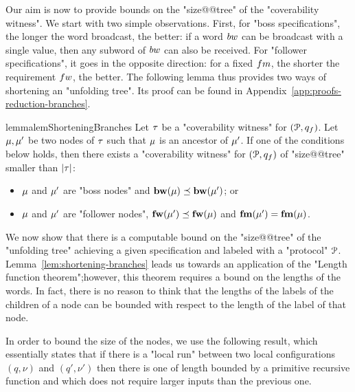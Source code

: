 Our aim is now to provide bounds on the "size@@tree" of the "coverability witness". We start with two simple observations. First, for "boss specifications", the longer the word broadcast, the better: if a word $\bossspec$ can be broadcast with a single value, then any subword of $\bossspec$ can also be received. 
For "follower specifications", it goes in the opposite direction: for a fixed $\followmessagespec$, the shorter the requirement $\followwordspec$, the better. The following lemma thus provides two ways of shortening an "unfolding tree". Its proof can be found in Appendix~\ref{app:proofs-reduction-branches}.

\begin{restatable}{lemma}{lemShorteningBranches} 
\label{lem:shortening-branches}
	Let $\tau$ be a "coverability witness" for $(\mathcal{P}, q_f)$.
	Let $\mu, \mu'$ be two nodes of $\tau$ such that $\mu$ is an ancestor of $\mu'$. If one of the conditions below holds, then there exists a "coverability witness" for $(\mathcal{P}, q_f)$ of "size@@tree" smaller than $|\tau|$:
	\begin{itemize}
	\item $\mu$ and $\mu'$ are "boss nodes" and $\mathbf{bw}(\mu) \preceq \mathbf{bw}(\mu')$; or
	\item $\mu$ and $\mu'$ are "follower nodes", $\mathbf{fw}(\mu') \preceq \mathbf{fw}(\mu)$ and $\mathbf{fm}(\mu')=\mathbf{fm}(\mu)$.
	\end{itemize} 
\end{restatable}


We now show that there is a computable bound on the "size@@tree" of the "unfolding tree" achieving a given specification and labeled with a "protocol" $\mathcal{P}$. Lemma~\ref{lem:shortening-branches} leads us towards an application of the "Length function theorem";however, this theorem requires a bound on the lengths of the words. In fact, there is no reason to think that the lengths of the labels of the children of a node can be bounded with respect to the length of the label of that node. 

In order to bound the size of the nodes, we use the following result, which essentially states that if there is a "local run" between two local configurations $(q, \nu)$ and $(q', \nu')$ then there is one of length bounded by a primitive recursive function and which does not require larger inputs than the previous one.


